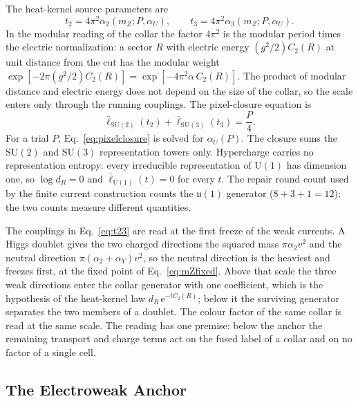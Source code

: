 \documentclass[11pt]{article}
\theoremstyle{remark}
\newcommand{\SU}{\mathrm{SU}}
\newcommand{\e}{\mathrm e}
\begin{document}
The heat-kernel source parameters are
\begin{equation}
t_2=4\pi^2\alpha_2(m_Z;P,\alpha_U),
\qquad
t_3=4\pi^2\alpha_3(m_Z;P,\alpha_U).
\label{eq:t23}
\end{equation}
In the modular reading of the collar the factor \(4\pi^2\) is the modular period
times the electric normalization: a sector \(R\) with electric energy
\((g^2/2)C_2(R)\) at unit distance from the cut has the modular weight
\(\exp[-2\pi(g^2/2)C_2(R)]=\exp[-4\pi^2\alpha\,C_2(R)]\). The product of modular
distance and electric energy does not depend on the size of the collar, so the
scale enters only through the running couplings.
The pixel-closure equation is
\begin{equation}
\boxed{
\bar\ell_{\SU(2)}(t_2)+\bar\ell_{\SU(3)}(t_3)=\frac{P}{4}.
}
\label{eq:pixelclosure}
\end{equation}
For a trial \(P\), Eq.~\eqref{eq:pixelclosure} is solved for \(\alpha_U(P)\).
The closure sums the \(\SU(2)\) and \(\SU(3)\) representation towers only.
Hypercharge carries no representation entropy: every irreducible representation
of \(\mathrm U(1)\) has dimension one, so \(\log d_R=0\) and
\(\bar\ell_{\mathrm U(1)}(t)=0\) for every \(t\). The repair round count used by the
finite current construction counts the \(\mathfrak u(1)\) generator
(\(8+3+1=12\)); the two counts measure different quantities.

The couplings in Eq.~\eqref{eq:t23} are read at the first freeze of the weak
currents. A Higgs doublet gives the two charged directions the squared mass
\(\pi\alpha_2v^2\) and the neutral direction \(\pi(\alpha_2+\alpha_Y)v^2\), so the
neutral direction is the heaviest and freezes first, at the fixed point of
Eq.~\eqref{eq:mZfixed}. Above that scale the three weak directions enter the collar
generator with one coefficient, which is the hypothesis of the heat-kernel law
\(d_R\,\e^{-tC_2(R)}\); below it the surviving generator separates the two members
of a doublet. The colour factor of the same collar is read at the same scale. The
reading has one premise: below the anchor the remaining transport and charge terms
act on the fused label of a collar and on no factor of a single cell.


\subsection{The Electroweak Anchor}
\label{sec:alpha-step-12}
\end{document}
